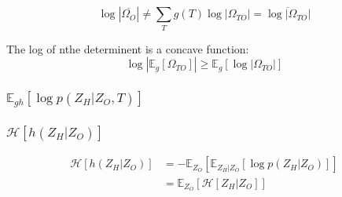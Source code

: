 \documentclass[11pt,a4paper]{article}
\newcommand{\Esp}{\mathds{E}}
\newcommand{\entr}{\mathcal{H}}
\begin{document}
$$ \log |\overline{\Omega_O}| \neq \sum_T g(T) \log |\Omega_{TO}| = \overline{\log |\Omega_{TO}|} $$ 

The log of nthe determinent is a concave function:
$$\log |\Esp_g[\Omega_{TO}]| \geq \Esp_g [\log |\Omega_{TO}|]$$

\subsubsection{$\Esp_{gh}[\log p(Z_H | Z_O,T) ]$}
\subsubsection{$ \entr[h(Z_H|Z_O)]$}

\begin{align*}
\entr[h(Z_H|Z_O)] &=   - \Esp_{Z_O}\left[\Esp_{Z_H|Z_O}[\log p(Z_H| Z_O)]\right]\\
&= \Esp_{Z_O}\left[\entr[Z_H|Z_O]\right]
\end{align*}
\end{document}
